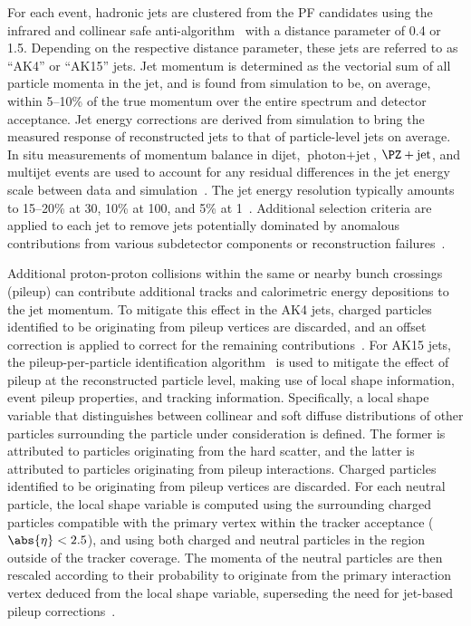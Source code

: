 For each event, hadronic jets are clustered from the PF candidates using the infrared and collinear safe anti-\kt algorithm~\cite{Cacciari:2008gp, Cacciari:fastjet1} with a distance parameter of 0.4 or 1.5. 
Depending on the respective distance parameter, these jets are referred to as ``AK4'' or ``AK15'' jets.
Jet momentum is determined as the vectorial sum of all particle momenta in the jet, and is found from simulation to be, on average, within 5--10\% of the true momentum over the entire \pt spectrum and detector acceptance. Jet energy corrections are derived from simulation to bring the measured response of
reconstructed jets to that of particle-level jets on average. In situ measurements of momentum balance in dijet, $\text{photon} + \text{jet}$, $\PZ + \text{jet}$, and multijet events are used to account for any residual differences in the jet energy scale between data and simulation~\cite{Khachatryan:2016kdb}. The jet energy resolution typically amounts to 15--20\% at 30\GeV, 10\% at 100\GeV, and 5\% at 1\TeV~\cite{Khachatryan:2016kdb}. Additional selection criteria are applied to each jet to remove jets potentially dominated by anomalous contributions from various subdetector components or reconstruction failures~\cite{CMS:2017wyc}.

Additional proton-proton collisions within the same or nearby bunch crossings (pileup) can contribute additional tracks and calorimetric energy depositions to the jet momentum.
To mitigate this effect in the AK4 jets, charged particles identified to be originating from pileup vertices are discarded, and an offset correction is applied to correct for 
the remaining contributions~\cite{Khachatryan:2016kdb}. 
For AK15 jets, the pileup-per-particle identification algorithm~\cite{Sirunyan:2020foa,puppi} is used to mitigate the effect of pileup at the reconstructed particle level, making use of local shape information, event pileup properties, and tracking information. Specifically, a local shape variable that distinguishes between collinear and soft diffuse distributions of other particles surrounding the particle under consideration is defined. The former is attributed to particles originating from the hard scatter, and the latter is attributed to particles originating from pileup interactions. Charged particles identified to be originating from pileup vertices are discarded. For each neutral particle, the local shape variable is computed using the surrounding charged particles compatible with the primary vertex within the tracker acceptance ($\abs{\eta} < 2.5$), and using both charged and neutral particles in the region outside of the tracker coverage. The momenta of the neutral particles are then rescaled according to their probability to originate from the primary interaction vertex deduced from the local shape variable, superseding the need for jet-based pileup corrections~\cite{Sirunyan:2020foa}. 


